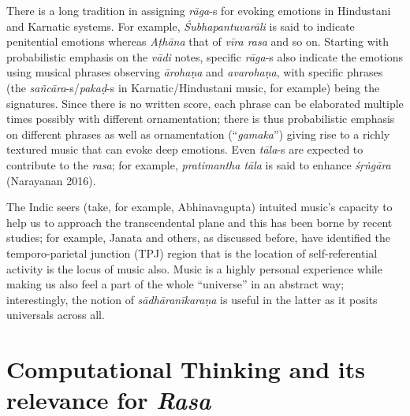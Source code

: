 There is a long tradition in assigning \textsl{rāga}-s for evoking emotions in Hindustani and Karnatic systems. For example, \textsl{Śubhapantuvarāli} is said to indicate penitential emotions whereas \textsl{Aṭhāna} that of \textsl{vīra rasa} and so on. Starting with probabilistic emphasis on the \textsl{vādi} notes, specific \textsl{rāga}-s also indicate the emotions using musical phrases observing \textsl{ārohaṇa} and \textsl{avarohaṇa}, with specific phrases (the \textsl{sañcāra}-s/\textsl{pakaḍ}-s in Karnatic/Hindustani music, for example) being the signatures. Since there is no written score, each phrase can be elaborated multiple times possibly with different ornamentation; there is thus probabilistic emphasis on different phrases as well as ornamentation (“\textsl{gamaka}”) giving rise to a richly textured music that can evoke deep emotions. Even \textsl{tāla}-s are expected to contribute to the \textsl{rasa}; for example, \textsl{pratimantha tāla} is said to enhance \textsl{śṛṅgāra} (Narayanan 2016). 

The Indic seers (take, for example, Abhinavagupta) intuited music’s capacity to help us to approach the transcendental plane and this has been borne by recent studies; for example, Janata and others, as discussed before, have identified the temporo-parietal junction (TPJ) region that is the location of self-referential activity is the locus of music also. Music is a highly personal experience while making us also feel a part of the whole “universe” in an abstract way; interestingly, the notion of \textsl{sādhāranīkaraṇa} is useful in the latter as it posits universals across all.

\section{Computational Thinking and its relevance for \textsl{Rasa}}\label{chap3-sec5}

